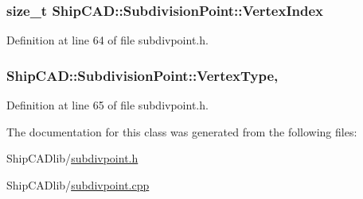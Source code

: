 \hypertarget{classShipCAD_1_1SubdivisionPoint_ad4ec233273e3bc788d2dd6736530d645}{
\subsubsection[{Vertex\-Index}]{\setlength{\rightskip}{0pt plus 5cm}size\-\_\-t Ship\-C\-A\-D\-::\-Subdivision\-Point\-::\-Vertex\-Index\hspace{0.3cm}{\ttfamily [read]}}}\label{classShipCAD_1_1SubdivisionPoint_ad4ec233273e3bc788d2dd6736530d645}


Definition at line 64 of file subdivpoint.\-h.

\hypertarget{classShipCAD_1_1SubdivisionPoint_ab926cef40515c3a4c94a902fb50aa35a}{
\subsubsection[{Vertex\-Type}]{ Ship\-C\-A\-D\-::\-Subdivision\-Point\-::\-Vertex\-Type\hspace{0.3cm}{\ttfamily [read]}, {\ttfamily [write]}}}\label{classShipCAD_1_1SubdivisionPoint_ab926cef40515c3a4c94a902fb50aa35a}


Definition at line 65 of file subdivpoint.\-h.



The documentation for this class was generated from the following files\-:\begin{DoxyCompactItemize}
\item 
Ship\-C\-A\-Dlib/\hyperlink{subdivpoint_8h}{subdivpoint.\-h}\item 
Ship\-C\-A\-Dlib/\hyperlink{subdivpoint_8cpp}{subdivpoint.\-cpp}\end{DoxyCompactItemize}
